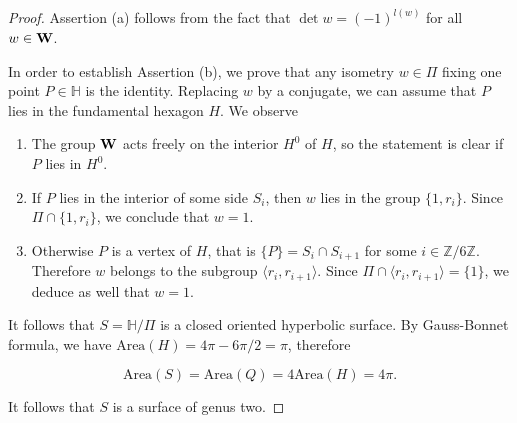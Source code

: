 \documentclass[12pt]{amsart}
\newcommand{\HP}{\mathbb{H}}
\newcommand{\Z}{\mathbb{Z}}
\newcommand{\Area}{\mathrm{Area}}
\begin{document}

\begin{proof} Assertion (a) follows from the fact that
$\det w= (-1)^{l(w)}$ for all $w\in {\bf W}$.

In order to establish Assertion (b), we prove that any
isometry $w\in \Pi$ fixing one point $P\in \HP$ is the identity. Replacing $w$ by a conjugate, we can assume that $P$ lies in the fundamental hexagon $H$. 
We observe

\begin{enumerate}
\item[(a)]
The group ${\bf W}$ acts freely on the interior $H^0$ of $H$, so the statement is clear if $P$ lies in $H^0$. 

\item[(b)]
If $P$ lies in the interior 
of some side $S_i$, then $w$ lies in the group 
$\{1, r_i\}$. Since
$\Pi\cap \{1, r_i\}$, we conclude that $w=1$.

\item[(c)]
Otherwise $P$ is a vertex of $H$, that is 
$\{P\}=S_i\cap S_{i+1}$ for some $i\in\Z/6\Z$.  Therefore $w$ belongs to the subgroup $\langle r_i, r_{i+1}\rangle$. 
Since
$\Pi\cap \langle r_i, r_{i+1}\rangle=\{1\}$, we deduce as well that $w=1$.
\end{enumerate}

It follows that $S=\HP/\Pi$ is a closed oriented hyperbolic 
surface. By Gauss-Bonnet formula,
we have $\Area(H)=4\pi-6\pi/2=\pi$, therefore

$$\Area(S)=\Area(Q)=4 \Area(H)=4\pi.$$

\noindent It follows that  $S$ is a surface of genus two.
\end{proof}
\end{document}
